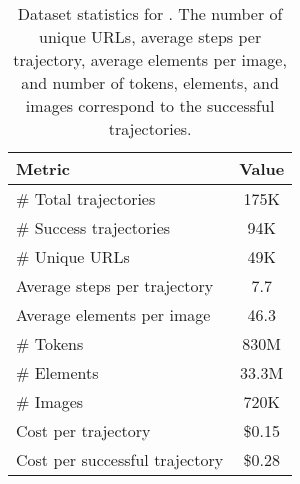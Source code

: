 \begin{table}[htbp]
\centering
\small
\begin{tabular}{@{}lc@{}}
\toprule
\bfseries Metric                        & \bfseries Value \\ \midrule
\# Total trajectories                         & 175K  \\ 
\# Success trajectories                    & 94K   \\ 
\# Unique URLs             & 49K \\ 
Average steps per trajectory          & 7.7   \\ 
Average elements per image   & 46.3  \\ 
\midrule
\# Tokens           & 830M  \\
\# Elements         & 33.3M \\
\# Images           & 720K\\ \midrule
Cost per trajectory         & \$0.15 \\
Cost per successful trajectory         & \$0.28 \\
\bottomrule
\end{tabular}
\caption{Dataset statistics for \model. The number of unique URLs, average steps per trajectory, average elements per image, and number of tokens, elements, and images correspond to the successful trajectories.
}
\label{tab:data_stat}
\end{table}